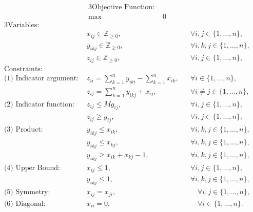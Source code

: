 
\begin{alignat}{3}
\text{Objective Function: } & \nonumber \\
\max \quad & 0 \label{eq::integer_objective_function}
\end{alignat}
\begin{alignat}{3}
\text{Variables: } & \nonumber \\ 
& x_{ij} \in \mathbb{Z}_{\geq 0}, 
&& \forall i,j \in \{1, \dots, n\}, \label{eq::IP_x_variable} \\ 
& y_{ikj} \in \mathbb{Z}_{\geq 0}, 
&& \forall i,k,j \in \{1, \dots, n\}, \label{eq::IP_y_variable} \\
& z_{ij} \in \mathbb{Z}_{\geq 0}, 
&& \forall i,j \in \{1, \dots, n\}, \label{eq::IP_z_variable} \\
\text{Constraints: } & \nonumber \\
\text{(1) Indicator argument: } 
& z_{ii} = \sum_{k = 1}^{n}y_{iki} - \sum_{k = 1}^{n} x_{ik}, 
&& \forall i \in \{1, \dots, n\}, \label{eq::IP_fund_matrix} \\
& z_{ij} = \sum_{k = 1}^{n}y_{ikj} + x_{ij}, 
&& \forall i \neq j \in \{1, \dots, n\}, \label{eq::IP_indicator_arg} \\
\text{(2) Indicator function: } 
& z_{ij} \leq M g_{ij}, 
&& \forall i, j \in \{1, \dots, n\}, \label{eq::IP_indicator_upper} \\
& z_{ij} \geq g_{ij}, 
&& \forall i, j \in \{1, \dots, n\}, \label{eq::IP_indicator_lower}\\
\text{(3) Product: } 
& y_{ikj} \leq x_{ik}, 
&& \forall i, k, j \in \{1, \dots, n\}, \label{eq::IP_product_upper_first} \\
& y_{ikj} \leq x_{kj}, 
&& \forall i, k, j \in \{1, \dots, n\}, \label{eq::IP_product_upper_second} \\
& y_{ikj} \geq x_{ik} + x_{kj} - 1, 
&& \forall i, k, j \in \{1, \dots, n\}, \label{eq::IP_product_lower} \\
\text{(4) Upper Bound: } 
& x_{ij} \leq 1, 
&& \forall i, j \in \{1, \dots, n\}, \label{eq::IP_x_upper_bound} \\
& y_{ikj} \leq 1, 
&& \forall i, k, j \in \{1, \dots, n\}, \label{eq::IP_y_upper_bound} \\
\text{(5) Symmetry: } 
& x_{ij} = x_{ji}, 
&&\quad \forall i,j \in \{1, \dots, n\}, \label{eq::IP_symmetry_x} \\
\text{(6) Diagonal: } 
& x_{ii} = 0, 
&&\quad \forall i \in \{1, \dots, n\}.  \label{eq::IP_diagonal_x} 
\end{alignat} \label{eq::integer_program}
